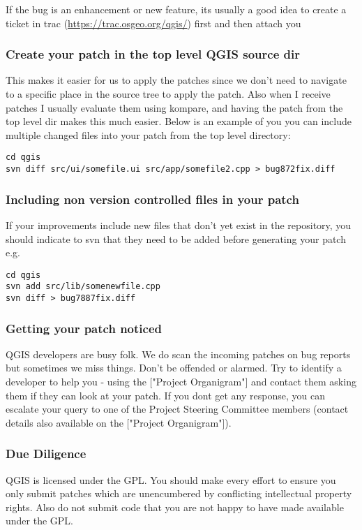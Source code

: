 If the bug is an enhancement or new feature, its usually a good idea to create
a ticket in trac (\url{https://trac.osgeo.org/qgis/}) first and then attach you 

\subsubsection{Create your patch in the top level QGIS source dir}
This makes it easier for us to apply the patches since we don't need to
navigate to a specific place in the source tree to apply the patch. Also when I
receive patches I usually evaluate them using kompare, and having the patch
from the top level dir makes this much easier. Below is an example of you you
can include multiple changed files into your patch from the top level
directory:

\begin{verbatim}
cd qgis
svn diff src/ui/somefile.ui src/app/somefile2.cpp > bug872fix.diff
\end{verbatim}

\subsubsection{Including non version controlled files in your patch}
If your improvements include new files that don't yet exist in the repository,
you should indicate to svn that they need to be added before generating your
patch e.g.

\begin{verbatim}
cd qgis
svn add src/lib/somenewfile.cpp
svn diff > bug7887fix.diff
\end{verbatim}

\subsubsection{Getting your patch noticed}
QGIS developers are busy folk. We do scan the incoming patches on bug reports
but sometimes we miss things.  Don't be offended or alarmed. Try to identify a
developer to help you - using the ["Project Organigram"] and contact them
asking them if they can look at your patch. If you dont get any response, you
can escalate your query to one of the Project Steering Committee members
(contact details also available on the ["Project Organigram"]).

\subsubsection{Due Diligence}
QGIS is licensed under the GPL. You should make every effort to ensure you only
submit patches which are unencumbered by conflicting intellectual property
rights. Also do not submit code that you are not happy to have made available
under the GPL.

